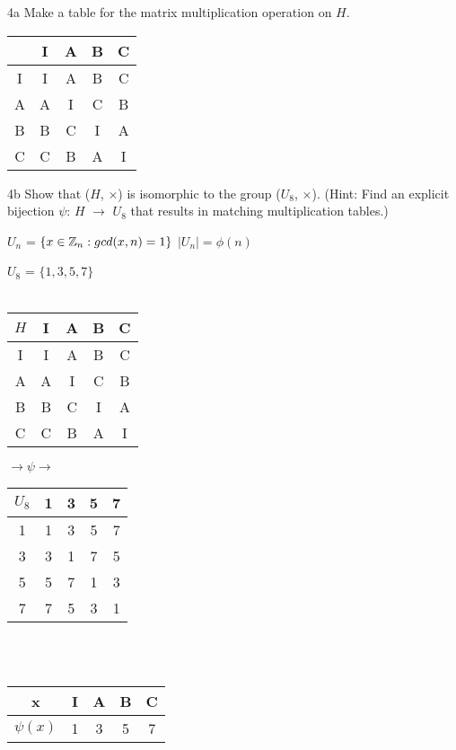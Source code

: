 \begin{question}{4a}
Make a table for the matrix multiplication operation on $H$.

\begin{tabular}[c]{c|cccc}
   & I & A & B & C  \\
   \hline
I  & I & A & B & C \\
A  & A & I & C & B \\
B  & B & C & I & A \\
C  & C & B & A & I
\end{tabular}

\end{question}

\begin{question}{4b}
Show that ($H$, $\times$) is isomorphic to the group ($U_8$, $\times$).
(Hint: Find an explicit bijection $\psi$: $H$ $\rightarrow$ $U_8$ that results in matching multiplication
tables.)

$U_n$ = $\{x \in \mathbb{Z}_n : gcd(x, n) = 1\}$ $|U_n| = \phi(n)$

$U_8$ = $\{1,3,5,7\}$
\\\\

\begin{tabular}[c]{c|cccc}
$H$ & I & A & B & C  \\
   \hline
I  & I & A & B & C \\
A  & A & I & C & B \\
B  & B & C & I & A \\
C  & C & B & A & I
\end{tabular}
$ \rightarrow \psi \rightarrow $
\begin{tabular}[c]{c|cccc}
$U_8$& 1 & 3 & 5 & 7  \\
   \hline
1  & 1 & 3 & 5 & 7 \\
3  & 3 & 1 & 7 & 5 \\
5  & 5 & 7 & 1 & 3 \\
7  & 7 & 5 & 3 & 1
\end{tabular}\\\\

\begin{tabular}{c|cccc}
x      & I & A & B & C \\
\hline
$\psi(x)$ & 1 & 3 & 5 & 7
\end{tabular}

\end{question}


